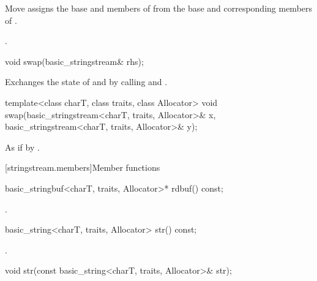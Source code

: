 \begin{itemdescr}
\pnum
\effects Move assigns the base and members of  from the base and corresponding
members of .

\pnum
\returns {}.
\end{itemdescr}

%
\begin{itemdecl}
void swap(basic_stringstream& rhs);
\end{itemdecl}

\begin{itemdescr}
\pnum
\effects Exchanges the state of  and
 by calling
 and
.
\end{itemdescr}


%
\begin{itemdecl}
template<class charT, class traits, class Allocator>
  void swap(basic_stringstream<charT, traits, Allocator>& x,
            basic_stringstream<charT, traits, Allocator>& y);
\end{itemdecl}

\begin{itemdescr}
\pnum
\effects As if by .
\end{itemdescr}

[stringstream.members]{Member functions}

%
\begin{itemdecl}
basic_stringbuf<charT, traits, Allocator>* rdbuf() const;
\end{itemdecl}

\begin{itemdescr}
\pnum
\returns
{}.
\end{itemdescr}

%
\begin{itemdecl}
basic_string<charT, traits, Allocator> str() const;
\end{itemdecl}

\begin{itemdescr}
\pnum
\returns
{}.
\end{itemdescr}

%
\begin{itemdecl}
void str(const basic_string<charT, traits, Allocator>& str);
\end{itemdecl}

